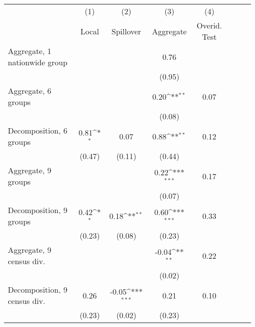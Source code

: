 \def\sym#1{\ifmmode^{#1}\else\(^{#1}\)\fi}          \begin{tabular}{l*{7}{c}}          \hline
  & (1) & (2) & (3)  & (4) \\ & Local & Spillover & Aggregate  & Overid. Test \\ \hline
Aggregate, 1 nationwide group&                     &                     &        0.76         &            \\
            &                     &                     &      (0.95)         &            \\
Aggregate, 6 groups&                     &                     &        0.20\sym{**} &        0.07\\
            &                     &                     &      (0.08)         &            \\
Decomposition, 6 groups&        0.81\sym{*}  &        0.07         &        0.88\sym{**} &        0.12\\
            &      (0.47)         &      (0.11)         &      (0.44)         &            \\
Aggregate, 9 groups&                     &                     &        0.22\sym{***}&        0.17\\
            &                     &                     &      (0.07)         &            \\
Decomposition, 9 groups&        0.42\sym{*}  &        0.18\sym{**} &        0.60\sym{***}&        0.33\\
            &      (0.23)         &      (0.08)         &      (0.23)         &            \\
Aggregate, 9 census div.&                     &                     &       -0.04\sym{**} &        0.22\\
            &                     &                     &      (0.02)         &            \\
Decomposition, 9 census div.&        0.26         &       -0.05\sym{***}&        0.21         &        0.10\\
            &      (0.23)         &      (0.02)         &      (0.23)         &            \\
\hline          \end{tabular}
